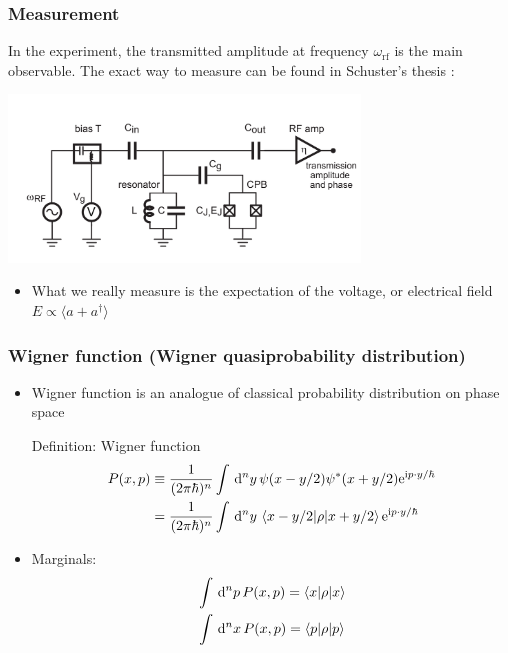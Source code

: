 \documentclass[xcolor=dvipsnames,hyperref={CJKbookmarks=true}]{beamer}
\newcommand{\dif}{\,\mathrm d}
\newcommand\mi{\mathrm{i}}
\newcommand\e{\mathrm{e}}
\newcommand{\rf}{\text{rf}}
\begin{document}
\begin{frame}[t]\frametitle{Measurement}
In the experiment, the transmitted amplitude at frequency $\omega_{\rf}$ is the 
main observable. The exact way to measure can be found in Schuster's thesis \cite{schuster2007circuit}: 
\begin{center}
  \includegraphics[width=0.7\textwidth]{measurement.png}
\end{center}
	\begin{itemize}
		\item What we really measure is the expectation of the voltage, or 
		electrical field $E\propto\langle a + a^\dag \rangle$
	\end{itemize}
\end{frame}

\begin{frame}[t]\frametitle{Wigner function (Wigner quasiprobability distribution)}
\begin{itemize}
	\item Wigner function is an analogue of classical probability distribution 
	on phase space
	\begin{block}{Definition: Wigner function}
	\begin{align*}
		P(x, p) &\equiv \frac{1}{(2\pi\hbar)^n}\int\dif^n y \,
		    \psi(x-y/2)\psi^*(x+y/2) \e^{\mi p\cdot y/\hbar} \\
		&= \frac{1}{(2\pi\hbar)^n}\int\dif^n y\, 
			\braket{x-y/2|\rho|x+y/2} \e^{\mi p\cdot y/\hbar}
	\end{align*}
	\end{block}
	\item Marginals: 
	\begin{align*}
		&\int\dif^n p\, P(x,p) = \braket{x|\rho|x} \\
		&\int\dif^n x\, P(x,p) = \braket{p|\rho|p}
	\end{align*}
\end{itemize}
\end{frame}
\end{document}
